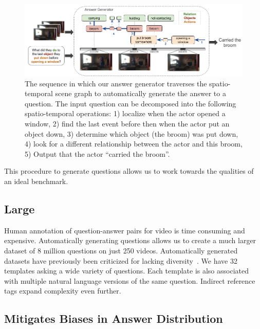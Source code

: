 \documentclass[10pt,twocolumn,letterpaper]{article}
\newcommand{\mgm}[1]{{\color{cyan}{mgm: #1}}}
\begin{document}
\begin{figure}[t]
\begin{center}
\includegraphics[width=0.8\linewidth]{Figures/figure_questionGenerator.png}
\end{center}
   \caption{The sequence in which our answer generator traverses the spatio-temporal scene graph to automatically generate the answer to a question. The input question can be decomposed into the following spatio-temporal operations: 
  1) localize when the actor opened a window, 
  2) find the last event before then when the actor put an object down, 
  3) determine which object (the broom) was put down, 
  4) look for a different relationship between the actor and this broom, 
  5) Output that the actor ``carried the broom''.}
\label{answer_generator}
\end{figure}



This procedure to generate questions allows us to work towards the qualities of an ideal benchmark. \mgm{If I change this in the beginning may need to chang this here}
    
\subsection{Large}
    
    Human annotation of question-answer pairs for video is time consuming and expensive. Automatically generating questions allows us to create a much larger dataset of 8 million questions on just 250 videos. Automatically generated datasets have previously been criticized for lacking diversity~\cite{yu2019activitynet}. We have 32 templates asking a wide variety of questions. Each template is also associated with multiple natural language versions of the same question. Indirect reference tags expand complexity even further. \mgm{need to upate the number of templates. It's really unimpressive atm though}

\subsection{Mitigates Biases in Answer Distribution}
    
\end{document}
